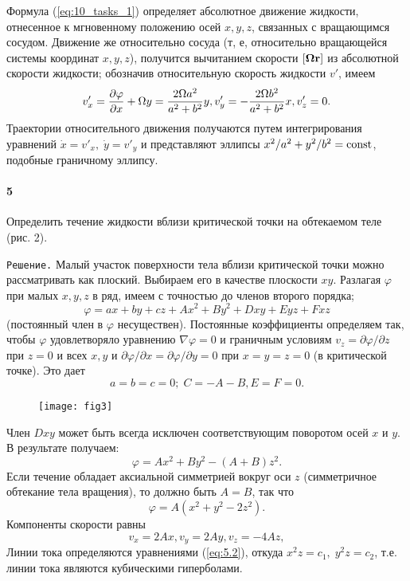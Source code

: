 Формула (\ref{eq:10_tasks_1}) определяет абсолютное движение жидкости, отнесенное к мгновенному
положению осей $x,y,z$, связанных с вращающимся сосудом. Движение же
относительно сосуда (т, е, относительно вращающейся системы координат $x,y,z$),
получится вычитанием скорости $\lbrack \mathbf{\Omega r} \rbrack$ из абсолютной
скорости жидкости; обозначив относительную скорость жидкости $v'$, имеем
\[
   v'_x = \frac{\partial{\varphi}}{\partial{x}}+\Omega y = \frac{2\Omega a^2}{a^2+b^2}y,
   v'_y = - \frac{2\Omega b^2}{a^2+b^2}x,
   v'_z = 0.
\]
Траектории относительного движения получаются путем интегрирования уравнений
$\dot x = v'_x, \; \dot y = v'_y$ и представляют эллипсы
$x^2/a^2+y^2/b^2 = \mathop{\mathrm{const}}\nolimits$, подобные граничному эллипсу.

\paragraph*{5}
Определить течение жидкости вблизи критической точки на обтекаемом теле (рис. 2).

\texttt{Решение.} Малый участок поверхности тела вблизи критической точки можно
рассматривать как плоский. Выбираем его в качестве плоскости $xy$. Разлагая
$\varphi$ при малых $x,y,z$ в ряд, имеем с точностью до членов второго порядка;
\[
   \varphi = ax + by + cz + Ax^2 + By^2 + Dxy + Eyz + Fxz
\]
(постоянный член в $\varphi$ несуществен). Постоянные коэффициенты определяем
так, чтобы $\varphi$ удовлетворяло уравнению $\nabla \varphi = 0$ и граничным
условиям $v_z = \partial \varphi/\partial z$ при $z = 0$ и всех $x,y$ и
$\partial \varphi/\partial x = \partial \varphi/\partial y = 0$ при
$x=y=z=0$ (в критической точке).  Это дает
\[
   a=b=c=0;\; C=-A-B, E=F=0.
\]

\begin{wrapfigure}{l}{6cm}
  \centering
  \texttt{[image: fig3]}
  \caption{\label{fig:f3}}
\end{wrapfigure}

Член $Dxy$ может быть всегда исключен соответствующим поворотом осей $x$ и $y$.
В результате получаем:
\begin{equation}
   \label{eq:10t2}
   \varphi = Ax^2+By^2-(A+B)z^2.
\end{equation}
Если течение обладает аксиальной симметрией вокруг оси $z$ (симметричное
 обтекание тела вращения), то должно быть $A = B$, так что
\begin{equation}
   \label{eq:10t3}
   \varphi = A(x^2 + y^2 -2z^2).
\end{equation}
Компоненты скорости равны
\[
   v_x = 2Ax,
   v_y = 2Ay,
   v_z = -4Az,
\]
Линии тока определяются уравнениями (\ref{eq:5.2}), откуда $x^2z=c_1,\;y^2z=c_2$, т.е.
линии тока являются кубическими гиперболами.

